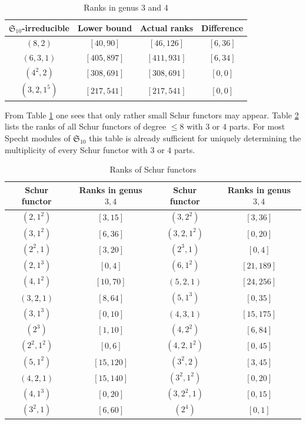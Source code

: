 \documentclass[12pt]{article}
\newcommand{\SymGroup}[1][n]{\mathfrak{S}_{#1}}
\theoremstyle{plain}
\theoremstyle{definition}
\theoremstyle{remark}
\begin{document}
\begin{table}[h]
    \centering
    \begin{tabular}{|c|c|c|c|}
\hline
$\SymGroup[10]$-irreducible & Lower bound & Actual ranks & Difference \\
\hline
$(8,2)$ & $[40, 90]$ & $[46, 126]$ & $[6, 36]$ \\ 
\hline
$(6,3,1)$ & $[405, 897]$ & $[411, 931]$ & $[6, 34]$ \\ 
\hline
$(4^2,2)$ & $[308, 691]$ & $[308, 691]$ & $[0, 0]$ \\ 
\hline
$(3,2,1^5)$ & $[217, 541]$ & $[217, 541]$ & $[0, 0]$ \\ 
\hline
    \end{tabular}
    \caption{Ranks in genus 3 and 4}
    \label{table:ranks34}
\end{table}

From Table \ref{table:ranks34} one sees that only rather small Schur functors may appear. Table \ref{table:rank_Schur34} lists the ranks of all Schur functors of degree $\leq 8$ with $3$ or $4$ parts. For most Specht modules of $\SymGroup[10]$ this table is already sufficient for uniquely determining the multiplicity of every Schur functor with $3$ or $4$ parts.


\begin{table}[h]
    \centering
    \begin{tabular}{|c|c||c|c|}
\hline 
Schur functor & Ranks in genus $3,4$ & Schur functor & Ranks in genus $3,4$ \\
\hline
$(2,1^2)$ & $[3, 15]$ & $(3,2^2)$ & $[3, 36]$ \\ 
\hline
$(3,1^2)$ & $[6, 36]$ & $(3,2,1^2)$ & $[0, 20]$ \\ 
\hline
$(2^2,1)$ & $[3, 20]$ & $(2^3,1)$ & $[0, 4]$ \\ 
\hline
$(2,1^3)$ & $[0, 4]$ & $(6,1^2)$ & $[21, 189]$ \\ 
\hline
$(4,1^2)$ & $[10, 70]$ & $(5,2,1)$ & $[24, 256]$ \\ 
\hline
$(3,2,1)$ & $[8, 64]$ & $(5,1^3)$ & $[0, 35]$ \\ 
\hline
$(3,1^3)$ & $[0, 10]$ & $(4,3,1)$ & $[15, 175]$ \\ 
\hline
$(2^3)$ & $[1, 10]$ & $(4,2^2)$ & $[6, 84]$ \\ 
\hline
$(2^2,1^2)$ & $[0, 6]$ & $(4,2,1^2)$ & $[0, 45]$ \\ 
\hline
$(5,1^2)$ & $[15, 120]$ & $(3^2,2)$ & $[3, 45]$ \\ 
\hline
$(4,2,1)$ & $[15, 140]$ & $(3^2,1^2)$ & $[0, 20]$ \\ 
\hline
$(4,1^3)$ & $[0, 20]$ & $(3,2^2,1)$ & $[0, 15]$ \\ 
\hline
$(3^2,1)$ & $[6, 60]$ & $(2^4)$ & $[0, 1]$ \\ 
\hline
    \end{tabular}
    \caption{Ranks of Schur functors}
    \label{table:rank_Schur34}
\end{table}
\end{document}
